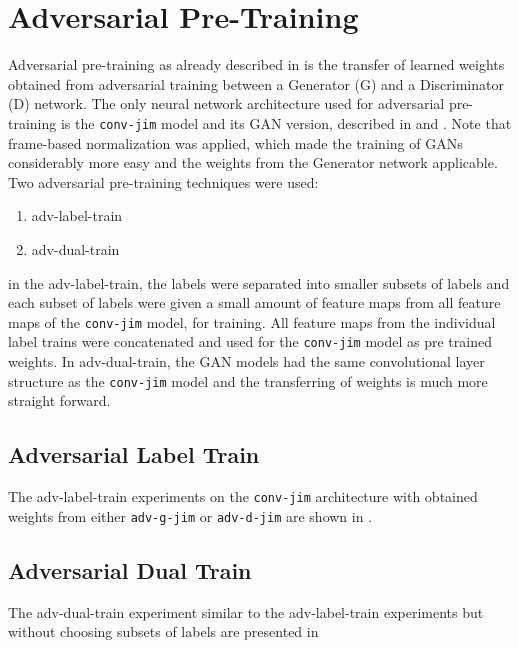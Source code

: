 
\section{Adversarial Pre-Training}\label{sec:exp_adv}
\thesisStateNotReady
Adversarial pre-training as already described in  is the transfer of learned weights obtained from adversarial training between a Generator (G) and a Discriminator (D) network.
The only neural network architecture used for adversarial pre-training is the \texttt{conv-jim} model and its GAN version, described in  and .
Note that frame-based normalization was applied, which made the training of GANs considerably more easy and the weights from the Generator network applicable.
Two adversarial pre-training techniques were used:
\begin{enumerate}
  \item adv-label-train 
  \item adv-dual-train
\end{enumerate}
in the adv-label-train, the labels were separated into smaller subsets of labels and each subset of labels were given a small amount of feature maps from all feature maps of the \texttt{conv-jim} model, for training. 
All feature maps from the individual label trains were concatenated and used for the \texttt{conv-jim} model as pre trained weights.
In adv-dual-train, the GAN models had the same convolutional layer structure as the \texttt{conv-jim} model and the transferring of weights is much more straight forward.



\subsection{Adversarial Label Train}
The adv-label-train experiments on the \texttt{conv-jim} architecture with obtained weights from either \texttt{adv-g-jim} or \texttt{adv-d-jim} are shown in .



\subsection{Adversarial Dual Train}
The adv-dual-train experiment similar to the adv-label-train experiments but without choosing subsets of labels are presented in 



